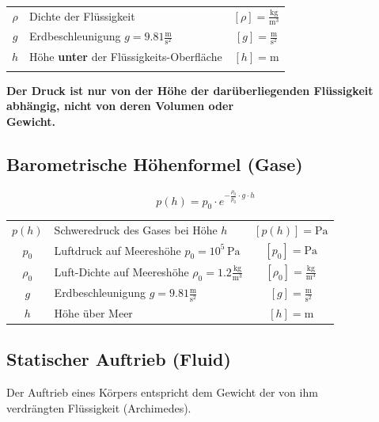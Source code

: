 	\begin{tabular}{c l c}
		\rule{0pt}{8pt}$\rho$ & Dichte der Flüssigkeit & $[\rho] = \mathrm{\frac{kg}{m^3}}$ \\
		\rule{0pt}{8pt}$g$ & Erdbeschleunigung $g = 9.81 \mathrm{\frac{m}{s^2}}$ & $[g] = \mathrm{\frac{m}{s^2}}$ \\
		$h$ & Höhe \textbf{unter} der Flüssigkeits-Oberfläche & $[h] = \mathrm{m}$ \\
		\\
	\end{tabular}
	
	\textbf{Der Druck ist nur von der Höhe der darüberliegenden Flüssigkeit abhängig, nicht von deren Volumen oder \\
	Gewicht.}
	
	

\subsection{Barometrische Höhenformel (Gase)}

$$ \boxed{ p(h) = p_0 \cdot e^ {- \frac{\rho_0}{p_0} \cdot g \cdot h} }$$	


	\begin{tabular}{c l c}
	$p(h)$ & Schweredruck des Gases bei Höhe $h$ & $[p(h)] = \mathrm{Pa}$ \\
	$p_0$ & Luftdruck auf Meereshöhe $p_0 = 10^5 \, \mathrm{Pa}$ & $[p_0] = \mathrm{Pa}$ \\ 
		\rule{0pt}{8pt}$\rho_0$ & Luft-Dichte auf Meereshöhe $\rho_0 = 1.2 \mathrm{\frac{kg}{m^3}}$ & $[\rho_0] = \mathrm{\frac{kg}{m^3}}$ \\
		\rule{0pt}{8pt}$g$ & Erdbeschleunigung $g = 9.81 \mathrm{\frac{m}{s^2}}$ & $[g] = \mathrm{\frac{m}{s^2}}$ \\
		$h$ & Höhe über Meer & $[h] = \mathrm{m}$ \\
	\end{tabular}
	
\subsection{Statischer Auftrieb (Fluid)}
Der Auftrieb eines Körpers entspricht dem Gewicht der von ihm \\
verdrängten Flüssigkeit (Archimedes). 



